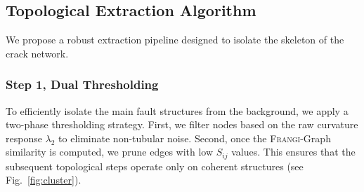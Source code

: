 \documentclass[conference]{IEEEtran}
\newcommand{\Frangi}[0]{\textsc{Frangi}}
\begin{document}
\subsection{Topological Extraction Algorithm}
We propose a robust extraction pipeline designed to isolate the skeleton of the crack network.


\subsubsection{Step 1, Dual Thresholding}
To efficiently isolate the main fault structures from the background, we apply a two-phase thresholding strategy. First, we filter nodes based on the raw curvature response $\lambda_2$ to eliminate non-tubular noise. Second, once the \Frangi{}-Graph similarity is computed, we prune edges with low $S_{ij}$ values. This ensures that the subsequent topological steps operate only on coherent structures (see Fig.~\ref{fig:cluster}).
\end{document}
